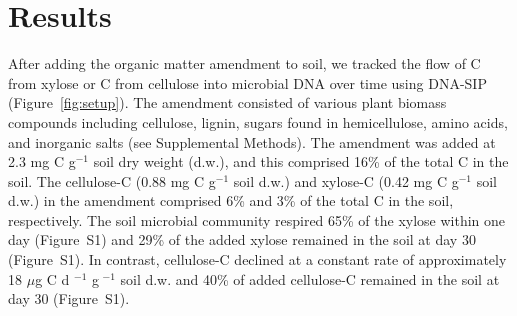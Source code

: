 \section{Results}
After adding the organic matter amendment to soil, we tracked the flow of
C from xylose or C from cellulose into microbial DNA over time using DNA-SIP
(Figure~\ref{fig:setup}). The amendment consisted of various plant biomass
compounds including cellulose, lignin, sugars found in hemicellulose, amino
acids, and inorganic salts (see Supplemental Methods). The amendment was added
at 2.3 mg C g$^{-1}$ soil dry weight (d.w.), and this comprised 16\% of the
total C in the soil. The cellulose-C (0.88 mg C g$^{-1}$ soil d.w.) and
xylose-C (0.42 mg C g$^{-1}$ soil d.w.) in the amendment comprised 6\% and 3\%
of the total C in the soil, respectively. The soil microbial community respired
65\% of the xylose within one day (Figure S1) and 29\% of the added xylose
remained in the soil at day 30 (Figure S1). In contrast, cellulose-C declined
at a constant rate of approximately 18 $\mu$g C d $^{-1}$ g $^{-1}$ soil d.w.
and 40\% of added cellulose-C remained in the soil at day 30 (Figure S1).

